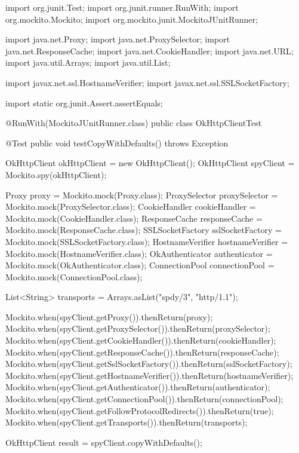 \begin{response}
  import org.junit.Test;
import org.junit.runner.RunWith;
import org.mockito.Mockito;
import org.mockito.junit.MockitoJUnitRunner;

import java.net.Proxy;
import java.net.ProxySelector;
import java.net.ResponseCache;
import java.net.CookieHandler;
import java.net.URL;
import java.util.Arrays;
import java.util.List;

import javax.net.ssl.HostnameVerifier;
import javax.net.ssl.SSLSocketFactory;

import static org.junit.Assert.assertEquals;

@RunWith(MockitoJUnitRunner.class)
public class OkHttpClientTest {

    @Test
    public void testCopyWithDefaults() throws Exception {
        OkHttpClient okHttpClient = new OkHttpClient();
        OkHttpClient spyClient = Mockito.spy(okHttpClient);

        Proxy proxy = Mockito.mock(Proxy.class);
        ProxySelector proxySelector = Mockito.mock(ProxySelector.class);
        CookieHandler cookieHandler = Mockito.mock(CookieHandler.class);
        ResponseCache responseCache = Mockito.mock(ResponseCache.class);
        SSLSocketFactory sslSocketFactory = Mockito.mock(SSLSocketFactory.class);
        HostnameVerifier hostnameVerifier = Mockito.mock(HostnameVerifier.class);
        OkAuthenticator authenticator = Mockito.mock(OkAuthenticator.class);
        ConnectionPool connectionPool = Mockito.mock(ConnectionPool.class);

        List<String> transports = Arrays.asList("spdy/3", "http/1.1");

        Mockito.when(spyClient.getProxy()).thenReturn(proxy);
        Mockito.when(spyClient.getProxySelector()).thenReturn(proxySelector);
        Mockito.when(spyClient.getCookieHandler()).thenReturn(cookieHandler);
        Mockito.when(spyClient.getResponseCache()).thenReturn(responseCache);
        Mockito.when(spyClient.getSslSocketFactory()).thenReturn(sslSocketFactory);
        Mockito.when(spyClient.getHostnameVerifier()).thenReturn(hostnameVerifier);
        Mockito.when(spyClient.getAuthenticator()).thenReturn(authenticator);
        Mockito.when(spyClient.getConnectionPool()).thenReturn(connectionPool);
        Mockito.when(spyClient.getFollowProtocolRedirects()).thenReturn(true);
        Mockito.when(spyClient.getTransports()).thenReturn(transports);

        OkHttpClient result = spyClient.copyWithDefaults();

}}
\end{response}

